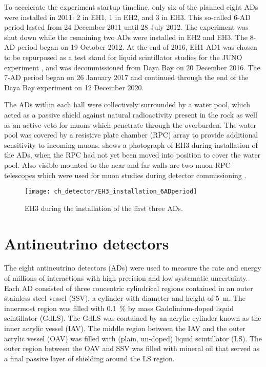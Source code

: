 To accelerate the experiment startup timeline,
only six of the planned eight ADs were installed in 2011:
2 in EH1, 1 in EH2, and 3 in EH3.
This so-called 6-AD period lasted from 24 December 2011 until 28 July 2012.
The experiment was shut down while the remaining two ADs were installed
in EH2 and EH3.
The 8-AD period began on 19 October 2012.
At the end of 2016, EH1-AD1 was chosen to be repurposed as a test stand
for liquid scintillator studies for the JUNO experiment \cite{junoproposal2016},
and was decommissioned from Daya Bay on 20 December 2016.
The 7-AD period began on 26 January 2017 and continued through the end of
the Daya Bay experiment on 12 December 2020.

The ADs within each hall were collectively surrounded by a water pool,
which acted as a passive shield against natural radioactivity present in the rock
as well as an active veto for muons which penetrate through the overburden.
The water pool was covered by a resistive plate chamber (RPC) array
to provide additional sensitivity to incoming muons.
 shows a photograph of EH3 during installation of the ADs,
when the RPC had not yet been moved into position to cover the water pool.
Also visible mounted to the near and far walls are two muon RPC telescopes
which were used for muon studies during detector commissioning \cite{muonsystem2015}.

\begin{figure}
    \centering
    \texttt{[image: ch\_detector/EH3\_installation\_6ADperiod]}
    \caption[View of EH3]{EH3 during the installation of the first three ADs.}
    \label{fig:eh3_wp_photo}
\end{figure}

\section{Antineutrino detectors}

The eight antineutrino detectors (ADs) were used to measure
the rate and energy of millions of \nuebar{} interactions with high precision
and low systematic uncertainty.
Each AD consisted of three concentric cylindrical regions
contained in an outer stainless steel vessel (SSV),
a cylinder with diameter and height of \SI{5}{\m}.
The innermost region was filled with \SI{0.1}{\percent} by mass
Gadolinium-doped liquid scintillator (GdLS).
The GdLS was contained by an acrylic cylinder known as the inner acrylic vessel (IAV).
The middle region between the IAV and the outer acrylic vessel (OAV) was filled
with (plain, un-doped) liquid scintillator (LS).
The outer region between the OAV and SSV was filled with mineral oil
that served as a final passive layer of shielding around the LS region.

